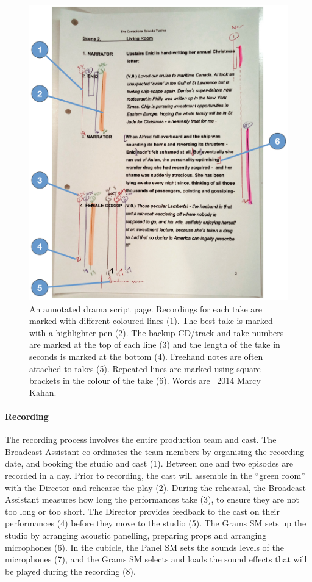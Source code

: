 \begin{figure}[p]
  \centering
  \includegraphics[width=\columnwidth]{figs/drama-markup-labelled.pdf}
  \caption[A drama script page with annotations that identify recorded takes and any mistakes made.]{An annotated drama
    script page. Recordings for each take are marked with different coloured lines (1). The best take is marked with a
    highlighter pen (2). The backup CD/track and take numbers are marked at the top of each line (3) and the length of
    the take in seconds is marked at the bottom (4).  Freehand notes are often attached to takes (5). Repeated lines
  are marked using square brackets in the colour of the take (6). Words are \textcopyright~2014 Marcy Kahan.}
  \label{fig:drama-script}
\end{figure}

\paragraph{Recording}
The recording process involves the entire production team and cast. The Broadcast Assistant co-ordinates the team
members by organising the recording date, and booking the studio and cast (1). Between one and two episodes are
recorded in a day.  Prior to recording, the cast will assemble in the ``green room'' with the Director and rehearse the
play (2). During the rehearsal, the Broadcast Assistant measures how long the performances take (3), to ensure they are
not too long or too short.  The Director provides feedback to the cast on their performances (4) before they move to
the studio (5). The Grams SM sets up the studio by arranging acoustic panelling, preparing props and arranging
microphones (6). In the cubicle, the Panel SM sets the sounds levels of the microphones (7), and the Grams SM selects
and loads the sound effects that will be played during the recording (8).

